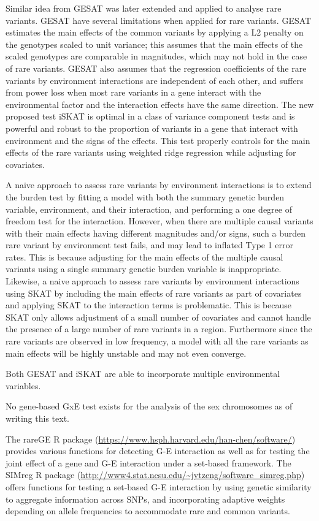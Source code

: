 \documentclass[]{book}
\theoremstyle{definition}
\theoremstyle{definition}
\theoremstyle{definition}
\theoremstyle{remark}
\begin{document}
Similar idea from GESAT was later extended and applied to analyse rare
variants. GESAT have several limitations when applied for rare variants.
GESAT estimates the main effects of the common variants by applying a L2
penalty on the genotypes scaled to unit variance; this assumes that the
main effects of the scaled genotypes are comparable in magnitudes, which
may not hold in the case of rare variants. GESAT also assumes that the
regression coefficients of the rare variants by environment interactions
are independent of each other, and suffers from power loss when most
rare variants in a gene interact with the environmental factor and the
interaction effects have the same direction. The new proposed test iSKAT
is optimal in a class of variance component tests and is powerful and
robust to the proportion of variants in a gene that interact with
environment and the signs of the effects. This test properly controls
for the main effects of the rare variants using weighted ridge
regression while adjusting for covariates.

A naive approach to assess rare variants by environment interactions is
to extend the burden test by fitting a model with both the summary
genetic burden variable, environment, and their interaction, and
performing a one degree of freedom test for the interaction. However,
when there are multiple causal variants with their main effects having
different magnitudes and/or signs, such a burden rare variant by
environment test fails, and may lead to inflated Type 1 error rates.
This is because adjusting for the main effects of the multiple causal
variants using a single summary genetic burden variable is
inappropriate. Likewise, a naive approach to assess rare variants by
environment interactions using SKAT by including the main effects of
rare variants as part of covariates and applying SKAT to the interaction
terms is problematic. This is because SKAT only allows adjustment of a
small number of covariates and cannot handle the presence of a large
number of rare variants in a region. Furthermore since the rare variants
are observed in low frequency, a model with all the rare variants as
main effects will be highly unstable and may not even converge.

Both GESAT and iSKAT are able to incorporate multiple environmental
variables.

No gene-based GxE test exists for the analysis of the sex chromosomes as
of writing this text.

The rareGE R package
(\url{https://www.hsph.harvard.edu/han-chen/software/}) provides various
functions for detecting G-E interaction as well as for testing the joint
effect of a gene and G-E interaction under a set-based framework. The
SIMreg R package
(\url{http://www4.stat.ncsu.edu/~jytzeng/software_simreg.php}) offers
functions for testing a set-based G-E interaction by using genetic
similarity to aggregate information across SNPs, and incorporating
adaptive weights depending on allele frequencies to accommodate rare and
common variants.
\end{document}
